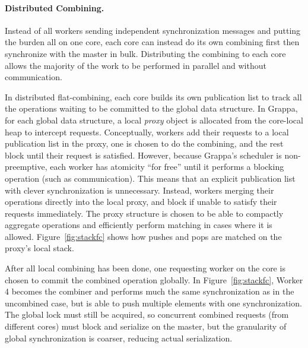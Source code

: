 \paragraph{Distributed Combining.}
Instead of all workers sending independent synchronization messages and putting the burden all on one core, each core can instead do its own combining first then synchronize with the master in bulk.
Distributing the combining to each core allows the majority of the work to be performed in parallel and without communication.


In distributed flat-combining, each core builds its own publication list to track all the operations waiting to be committed to the global data structure.
In Grappa, for each global data structure, a local \emph{proxy} object is allocated from the core-local heap to intercept requests.
Conceptually, workers add their requests to a local publication list in the proxy, one is chosen to do the combining, and the rest block until their request is satisfied.
However, because Grappa's scheduler is non-preemptive, each worker has atomicity ``for free'' until it performs a blocking operation (such as communication).
This means that an explicit publication list with clever synchronization is unnecessary.
Instead, workers merging their operations directly into the local proxy, and block if unable to satisfy their requests immediately.
The proxy structure is chosen to be able to compactly aggregate operations and efficiently perform matching in cases where it is allowed. Figure~\ref{fig:stackfc} shows how pushes and pops are matched on the proxy's local stack.

After all local combining has been done, one requesting worker on the core is chosen to commit the combined operation globally. In Figure~\ref{fig:stackfc}, Worker 4 becomes the combiner and performs much the same synchronization as in the uncombined case, but is able to push multiple elements with one synchronization. The global lock must still be acquired, so concurrent combined requests (from different cores) must block and serialize on the master, but the granularity of global synchronization is coarser, reducing actual serialization.

